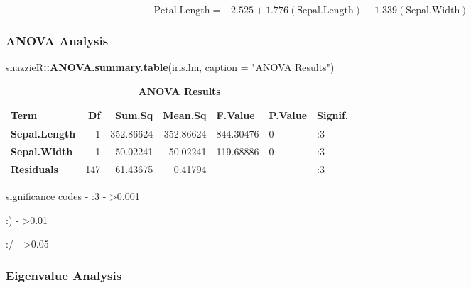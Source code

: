 \documentclass[
]{article}
\newenvironment{Shaded}{\begin{snugshade}}{\end{snugshade}}
\newcommand{\AttributeTok}[1]{\textcolor[rgb]{0.13,0.29,0.53}{#1}}
\newcommand{\FunctionTok}[1]{\textcolor[rgb]{0.13,0.29,0.53}{\textbf{#1}}}
\newcommand{\NormalTok}[1]{#1}
\newcommand{\SpecialCharTok}[1]{\textcolor[rgb]{0.81,0.36,0.00}{\textbf{#1}}}
\newcommand{\StringTok}[1]{\textcolor[rgb]{0.31,0.60,0.02}{#1}}
\begin{document}
\[\text{Petal.Length} = -2.525 + 1.776 (\text{Sepal.Length}) - 1.339 (\text{Sepal.Width})\]

\subsubsection{ANOVA Analysis}\label{anova-analysis}

\begin{Shaded}
\begin{Highlighting}[]
\NormalTok{snazzieR}\SpecialCharTok{::}\FunctionTok{ANOVA.summary.table}\NormalTok{(iris.lm, }\AttributeTok{caption =} \StringTok{"ANOVA Results"}\NormalTok{)}
\end{Highlighting}
\end{Shaded}

\begin{table}[H]
\centering
\caption{\label{tab:unnamed-chunk-6}\textbf{ANOVA Results}}
\centering
\begin{threeparttable}
\begin{tabular}[t]{|>{}l|r|r|r|l|l|>{}l|}
\hline
\textbf{Term} & \textbf{Df} & \textbf{Sum.Sq} & \textbf{Mean.Sq} & \textbf{F.Value} & \textbf{P.Value} & \textbf{Signif.}\\
\hline
\textbf{Sepal.Length} & 1 & 352.86624 & 352.86624 & 844.30476 & 0 & :3\\
\hline
\textbf{Sepal.Width} & 1 & 50.02241 & 50.02241 & 119.68886 & 0 & :3\\
\hline
\textbf{Residuals} & 147 & 61.43675 & 0.41794 &  &  & :3\\
\hline
\end{tabular}
\begin{tablenotes}[para]
\item 
\item 
\item 
\item significance codes -  :3 -  >0.001 
\item :) - >0.01
\item :/ - >0.05 
\item 
\end{tablenotes}
\end{threeparttable}
\end{table}

\subsubsection{Eigenvalue Analysis}\label{eigenvalue-analysis}
\end{document}
